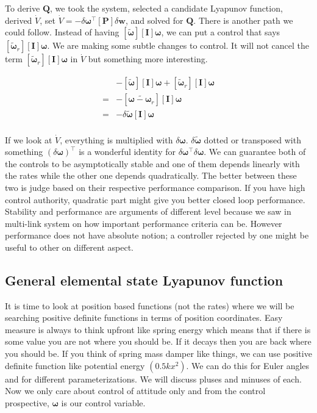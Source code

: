 \documentclass{article}
\begin{document}
To derive $\bm{Q}$, we took the system, selected a candidate Lyapunov function, derived $\dot{V}$, set $\dot{V}=-\delta\bm{\omega}^{\intercal}[\bm{P}]\delta\bm{w}$, and solved for $\bm{Q}$. There is another path we could follow. Instead of having $[\tilde{\bm{\omega}}][\bm{I}]\bm{\omega}$, we can put a control that says $[\tilde{\bm{\omega}}_{r}][\bm{I}]\bm{\omega}$. We are making some subtle changes to control. It will not cancel the term $[\tilde{\bm{\omega}}_{r}][\bm{I}]\bm{\omega}$ in $\dot{V}$ but something more interesting.

\begin{equation*}
  \begin{split}
    &-[\tilde{\bm{\omega}}][\bm{I}]\bm{\omega}+[\tilde{\bm{\omega}}_{r}][\bm{I}]\bm{\omega}\\
    =&-[\tilde{\bm{\omega}-\bm{\omega}_{r}}][\bm{I}]\bm{\omega}\\
    =&-\delta\tilde{\bm{\omega}}[\bm{I}]\bm{\omega}\\
  \end{split}
\end{equation*}

If we look at $\dot{V}$, everything is multiplied with $\delta\bm{\omega}$. $\delta\tilde{\bm{\omega}}$ dotted or transposed with something $(\delta\bm{\omega})^{\intercal}$ is a wonderful identity for $\delta\bm{\omega}^{\intercal}\delta\bm{\omega}$. We can guarantee both of the controls to be asymptotically stable and one of them depends linearly with the rates while the other one depends quadratically. The better between these two is judge based on their respective performance comparison. If you have high control authority, quadratic part might give you better closed loop performance.  Stability and performance are arguments of different level because we saw in multi-link system on how important performance criteria can be. However performance does not have absolute notion; a controller rejected by one might be useful to other on different aspect. 

\subsection{General elemental state Lyapunov function}
It is time to look at position based functions (not the rates) where we will be searching positive definite functions in terms of position coordinates. Easy measure is always to think upfront like spring energy which means that if there is some value you are not where you should be. If it decays then you are back where you should be. If you think of spring mass damper like things, we can use positive definite function like potential energy $(0.5kx^{2})$. We can do this for Euler angles and for different parameterizations. We will discuss pluses and minuses of each. Now we only care about control of attitude only and from the control prospective, $\bm{\omega}$ is our control variable.
\end{document}
